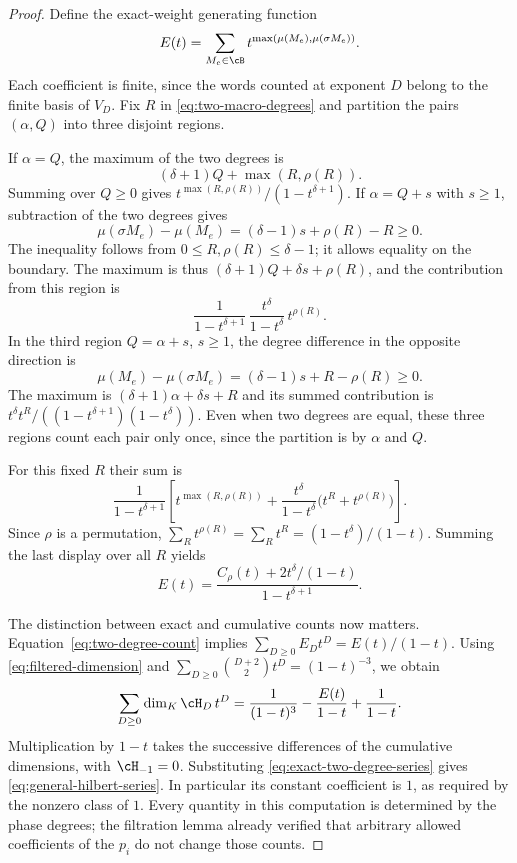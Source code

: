 \begin{proof}
Define the exact-weight generating function
\[
  E(t)=\sum_{M_e\in\cB}
      t^{\max(\mu(M_e),\mu(\sigma M_e))}.
\]
Each coefficient is finite, since the words counted at exponent $D$
belong to the finite basis of $V_D$.  Fix $R$ in
\eqref{eq:two-macro-degrees} and partition the pairs $(\alpha,Q)$
into three disjoint regions.

If $\alpha=Q$, the maximum of the two degrees is
\[
  (\delta+1)Q+\max(R,\rho(R)).
\]
Summing over $Q\ge0$ gives
$t^{\max(R,\rho(R))}/(1-t^{\delta+1})$.
If $\alpha=Q+s$ with $s\ge1$, subtraction of the two degrees gives
\[
  \mu(\sigma M_e)-\mu(M_e)
     =(\delta-1)s+\rho(R)-R\ge0.
\]
The inequality follows from $0\le R,\rho(R)\le\delta-1$;
it allows equality on the boundary.  The maximum is thus
$(\delta+1)Q+\delta s+\rho(R)$, and the contribution from this
region is
\[
  \frac{1}{1-t^{\delta+1}}\,
  \frac{t^\delta}{1-t^\delta}\,t^{\rho(R)}.
\]
In the third region $Q=\alpha+s$, $s\ge1$, the degree difference
in the opposite direction is
\[
  \mu(M_e)-\mu(\sigma M_e)
     =(\delta-1)s+R-\rho(R)\ge0.
\]
The maximum is $(\delta+1)\alpha+\delta s+R$ and its summed
contribution is
$t^\delta t^R/((1-t^{\delta+1})(1-t^\delta))$.
Even when two degrees are equal, these three regions count each
pair only once, since the partition is by $\alpha$ and $Q$.

For this fixed $R$ their sum is
\[
  \frac{1}{1-t^{\delta+1}}
  \left[
    t^{\max(R,\rho(R))}
    +\frac{t^\delta}{1-t^\delta}
         \bigl(t^R+t^{\rho(R)}\bigr)
  \right].
\]
Since $\rho$ is a permutation,
$\sum_Rt^{\rho(R)}=\sum_Rt^R=(1-t^\delta)/(1-t)$.
Summing the last display over all $R$ yields
\begin{equation}
  E(t)=\frac{C_\rho(t)+2t^\delta/(1-t)}{1-t^{\delta+1}}.
  \label{eq:exact-two-degree-series}
\end{equation}

The distinction between exact and cumulative counts now matters.
Equation~\eqref{eq:two-degree-count} implies
$\sum_{D\ge0}E_Dt^D=E(t)/(1-t)$.
Using \eqref{eq:filtered-dimension} and
$\sum_{D\ge0}\binom{D+2}{2}t^D=(1-t)^{-3}$, we obtain
\[
  \sum_{D\ge0}\dim_K\cH_D\,t^D
    =\frac{1}{(1-t)^3}-\frac{E(t)}{1-t}+
      \frac{1}{1-t}.
\]
Multiplication by $1-t$ takes the successive differences of the
cumulative dimensions, with $\cH_{-1}=0$.  Substituting
\eqref{eq:exact-two-degree-series} gives
\eqref{eq:general-hilbert-series}.  In particular its constant
coefficient is $1$, as required by the nonzero class of $1$.
Every quantity in this computation is determined by the phase degrees;
the filtration lemma already verified that arbitrary allowed
coefficients of the $p_i$ do not change those counts.
\end{proof}

